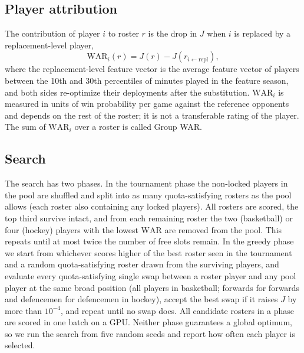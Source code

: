 \subsection{Player attribution}
\label{sec:war}
The contribution of player $i$ to roster $r$ is the drop in $J$ when $i$ is replaced by a replacement-level player,
\begin{equation}
\mathrm{WAR}_i(r)=J(r)-J(r_{i\leftarrow\text{repl}}),
\end{equation}
where the replacement-level feature vector is the average feature vector of players between the 10th and 30th percentiles of minutes played in the feature season, and both sides re-optimize their deployments after the substitution. $\mathrm{WAR}_i$ is measured in units of win probability per game against the reference opponents and depends on the rest of the roster; it is not a transferable rating of the player. The sum of $\mathrm{WAR}_i$ over a roster is called Group WAR.

\subsection{Search}
\label{sec:search}
The search has two phases. In the tournament phase the non-locked players in the pool are shuffled and split into as many quota-satisfying rosters as the pool allows (each roster also containing any locked players). All rosters are scored, the top third survive intact, and from each remaining roster the two (basketball) or four (hockey) players with the lowest $\mathrm{WAR}$ are removed from the pool. This repeats until at most twice the number of free slots remain. In the greedy phase we start from whichever scores higher of the best roster seen in the tournament and a random quota-satisfying roster drawn from the surviving players, and evaluate every quota-satisfying single swap between a roster player and any pool player at the same broad position (all players in basketball; forwards for forwards and defencemen for defencemen in hockey), accept the best swap if it raises $J$ by more than $10^{-4}$, and repeat until no swap does. All candidate rosters in a phase are scored in one batch on a GPU. Neither phase guarantees a global optimum, so we run the search from five random seeds and report how often each player is selected.
